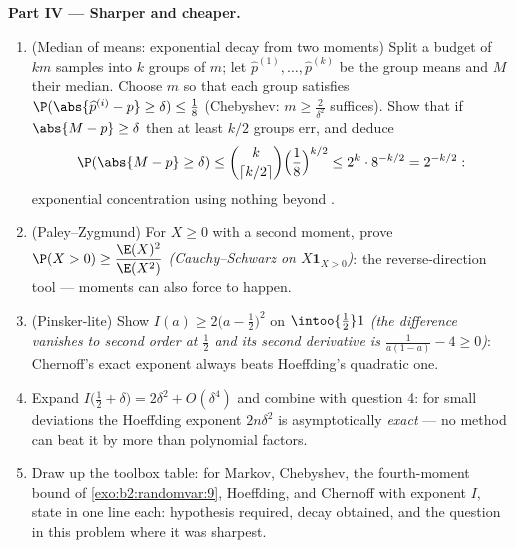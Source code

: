 \begin{problem}
\medskip
\noindent\textbf{Part IV --- Sharper and cheaper.}
\begin{enumerate}[resume]
  \item (Median of means: exponential decay from two moments)
        Split a budget of $km$ samples into $k$ 
        groups of $m$; let $\widehat p^{(1)}, \dots, \widehat
        p^{(k)}$ be the group means and $M$ their median.
        Choose $m$ so that each group satisfies
        $\P(\abs{\widehat p^{(i)} - p} \geq \delta) \leq
        \frac18$ (Chebyshev: $m \geq \frac2{\delta^2}$
        suffices). Show that if $\abs{M - p} \geq \delta$
        then at least $k/2$ groups err, and deduce
        \[
        \P(\abs{M - p} \geq \delta)
        \leq \binom{k}{\lceil k/2\rceil}\Bigl(\frac18
        \Bigr)^{k/2}
        \leq 2^k\cdot 8^{-k/2} = 2^{-k/2} :
        \]
        exponential concentration using nothing beyond
        .
  \item (Paley--Zygmund) For $X \geq 0$ with a second moment,
        prove $\P(X > 0) \geq \dfrac{\E(X)^2}{\E(X^2)}$
        \emph{(Cauchy--Schwarz on $X\mathbf 1_{X>0}$)}: the
        reverse-direction tool --- moments can also force
         to happen.
  \item (Pinsker-lite) Show $I(a) \geq 2\bigl(a -
        \tfrac12\bigr)^2$ on $\intoo{\frac12}1$ \emph{(the
        difference vanishes to second order at $\frac12$ and
        its second derivative is $\frac1{a(1-a)} - 4 \geq
        0$)}: Chernoff's exact exponent always beats
        Hoeffding's quadratic one.
  \item Expand $I\bigl(\tfrac12 + \delta\bigr) = 2\delta^2 +
        O(\delta^4)$ and combine with question 4: for small
        deviations the Hoeffding exponent $2n\delta^2$ is
        asymptotically \emph{exact} --- no method can beat it
        by more than polynomial factors.
  \item Draw up the toolbox table: for Markov, Chebyshev, the
        fourth-moment bound of \cref{exo:b2:randomvar:9},
        Hoeffding, and Chernoff with exponent $I$, state in
        one line each: hypothesis required, decay obtained,
        and the question in this problem where it was
        sharpest.
\end{enumerate}


\end{problem}
